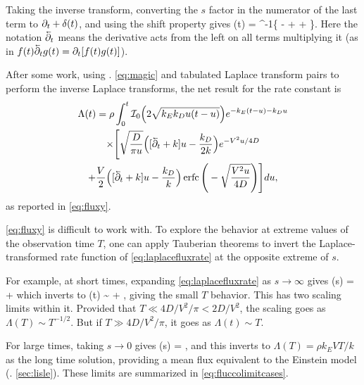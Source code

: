 Taking the inverse transform, converting the $s$ factor in the numerator of the last term to $\partial_t + \delta(t)$, and using the shift property gives \citep[e.g.][]{Arfken1985}
\be \Lambda(t) = \rho {}^{-1}\Bigg\{ -  +  + \Bigg\}.\ee
Here the notation $\cev{\pt}$ means the derivative acts from the left on all terms multiplying it (as in $f(t)\cev{\pt} g(t) = \pt [f(t)g(t)]$).

After some work, using \DIFdelbegin {}\DIFdelend \DIFaddbegin {}\DIFaddend . \ref{eq:magic} and tabulated Laplace transform pairs \citep[e.g.][]{Arfken1985,Prudnikov1992a} to perform the inverse Laplace transforms, the net result for the rate constant is
\begin{multline} 
	\Lambda(t) = \rho \int_0^t \mathcal{I}_0\Big(2\sqrt{k_Ek_Du(t-u)}\Big)e^{-k_E(t-u)-k_D u} \\
	\times \Bigg[\sqrt{\frac{D}{\pi u}}\Big([\cev{\partial_t} + k]u-\frac{k_D}{2 k}\Big)e^{-V^2 u/4D}  \\ + \frac{V}{2}\Big([\cev{\partial_t} + k]u -\frac{k_D}{k}\Big) \erfc\Bigg(-\sqrt{\frac{V^2 u}{4D}}\Bigg)\Bigg] du,
\end{multline}
as reported in \DIFdelbegin {}\DIFdelend \DIFaddbegin {}\DIFaddend \ref{eq:fluxy}.

\label{sec:fluxlimits}
\DIFdelbegin {}\DIFdelend \DIFaddbegin {}\DIFaddend \ref{eq:fluxy} is difficult to work with. To explore the behavior at extreme values of the observation time $T$, one can apply Tauberian theorems \DIFdelbegin {}\DIFdelend \DIFaddbegin {}\DIFaddend to invert the Laplace-transformed rate function of \DIFdelbegin {}\DIFdelend \DIFaddbegin {}\DIFaddend \ref{eq:laplacefluxrate} at the opposite extreme of $s$.

For example, at short times, expanding \DIFdelbegin {}\DIFdelend \DIFaddbegin {}\DIFaddend \ref{eq:laplacefluxrate} as $s\rightarrow \infty$ gives
\be \tilde{\Lambda}(s) =  +  \ee
which inverts to
\be \Lambda(t) \sim {} + ,\ee
giving the small $T$ behavior.
This has two scaling limits within it. Provided that $T \ll 4D/V^2/\pi < 2 D/V^2$, the scaling goes as $\Lambda(T) \sim T^{-1/2}$. But if $T\gg 4D/V^2/\pi$, it goes as $\Lambda(t) \sim T$.
\DIFdelbegin %

\DIFdelend For large times, taking $s\rightarrow 0 $ gives
\be \tilde{\Lambda}(s) = , \ee
and this inverts to $\Lambda(T) = \rho k_E V T/k$ as the long time solution, providing a mean flux equivalent to the Einstein model (\DIFdelbegin {}\DIFdelend \DIFaddbegin {}\DIFaddend . \ref{sec:lisle}).
These limits are summarized in \DIFdelbegin {}\DIFdelend \DIFaddbegin {}\DIFaddend \ref{eq:fluccolimitcases}.
